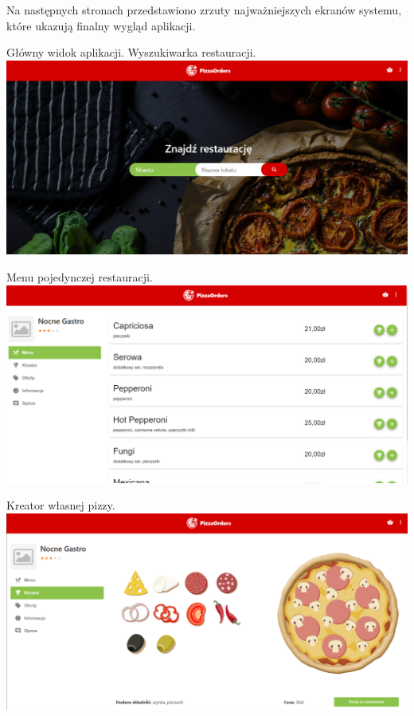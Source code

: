 \documentclass[12pt]{article}
\begin{document}
Na następnych stronach przedstawiono zrzuty najważniejszych ekranów systemu, które ukazują finalny wygląd aplikacji.
\clearpage

Główny widok aplikacji. Wyszukiwarka restauracji. \\

\includegraphics[width=16cm]{main}

\vspace{1cm}
Menu pojedynczej restauracji. \\

\includegraphics[width=16cm]{menu}

\clearpage

Kreator własnej pizzy. \\

\includegraphics[width=16cm]{creator}
\end{document}
